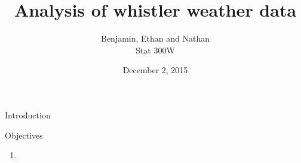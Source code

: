 \documentclass{beamer}
\begin{document}
\title{Analysis of whistler weather data}
\author{Benjamin, Ethan and Nathan \\
Stat 300W}
\date{December 2, 2015}

\begin{frame}
\titlepage
\end{frame}

\begin{frame}{Introduction}

Objectives

\begin{enumerate}
\item 
\end{enumerate}

\end{frame}
\end{document}
